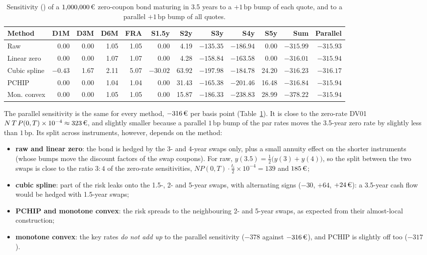 \documentclass[11pt,a4paper]{article}
\theoremstyle{plain}
\theoremstyle{definition}
\newcommand{\bp}{\,\mathrm{bp}}
\newcommand{\eur}{\text{\texteuro}}
\begin{document}
\begin{table}[htbp]
\centering
\small
\setlength{\tabcolsep}{4pt}
\begin{tabular}{@{}lrrrrrrrrrrr@{}}
\toprule
Method & D1M & D3M & D6M & FRA & S1.5y & S2y & S3y & S4y & S5y & Sum & Parallel \\
\midrule
Raw & 0.00 & 0.00 & 1.05 & 1.05 & 0.00 & 4.19 & $-135.35$ & $-186.94$ & 0.00 & $-315.99$ & $-315.93$ \\
Linear zero & 0.00 & 0.00 & 1.07 & 1.07 & 0.00 & 4.28 & $-158.84$ & $-163.58$ & 0.00 & $-316.01$ & $-315.94$ \\
Cubic spline & $-0.43$ & 1.67 & 2.11 & 5.07 & $-30.02$ & 63.92 & $-197.98$ & $-184.78$ & 24.20 & $-316.23$ & $-316.17$ \\
PCHIP & 0.00 & 0.00 & 1.04 & 1.04 & 0.00 & 31.43 & $-165.38$ & $-201.46$ & 16.48 & $-316.84$ & $-315.94$ \\
Mon. convex & 0.00 & 0.00 & 1.05 & 1.05 & 0.00 & 15.87 & $-186.33$ & $-238.83$ & 28.99 & $-378.22$ & $-315.94$ \\
\bottomrule
\end{tabular}
\caption{Sensitivity (\eur) of a $1{,}000{,}000\,\eur$ zero-coupon bond maturing in 3.5 years to a $+1\bp$ bump of each quote, and to a parallel $+1\bp$ bump of all quotes.}
\label{tab:krd}
\end{table}

The parallel sensitivity is the same for every method, $-316\,\eur$ per basis point (Table~\ref{tab:krd}). It is close to the zero-rate DV01 $N\,T\,P(0,T)\times10^{-4}\approx323\,\eur$, and slightly smaller because a parallel $1\bp$ bump of the par rates moves the 3.5-year zero rate by slightly less than $1\bp$. Its split across instruments, however, depends on the method:
\begin{itemize}
    \item \textbf{raw and linear zero}: the bond is hedged by the 3- and 4-year swaps only, plus a small annuity effect on the shorter instruments (whose bumps move the discount factors of the swap coupons). For raw, $y(3.5)=\frac12\bigl(y(3)+y(4)\bigr)$, so the split between the two swaps is close to the ratio $3:4$ of the zero-rate sensitivities, $N P(0,T)\cdot\frac{t_i}{2}\times10^{-4}=139$ and $185\,\eur$;
    \item \textbf{cubic spline}: part of the risk leaks onto the 1.5-, 2- and 5-year swaps, with alternating signs ($-30$, $+64$, $+24\,\eur$): a 3.5-year cash flow would be hedged with 1.5-year swaps;
    \item \textbf{PCHIP and monotone convex}: the risk spreads to the neighbouring 2- and 5-year swaps, as expected from their almost-local construction;
    \item \textbf{monotone convex}: the key rates \emph{do not add up} to the parallel sensitivity ($-378$ against $-316\,\eur$), and PCHIP is slightly off too ($-317$).
\end{itemize}
\end{document}
